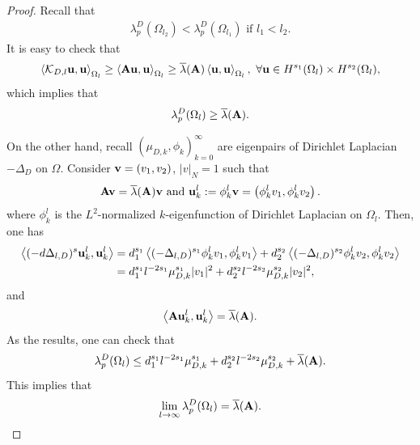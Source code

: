 \documentclass[10pt,a4paper]{amsart}
\def\O{\Omega}
\begin{document}
\begin{proof}
Recall that  
\begin{align*}
\lambda_p^D(\O_{l_2})<\lambda_p^D(\O_{l_1}) \text{ if }l_1<l_2.
\end{align*}
It is easy to check that
\begin{align*}
\left<\mathcal{K}_{D,l}{\bf u},{\bf u}\right>_{\O_l}\geq \left<{\bf Au},{\bf u}\right>_{\O_l} \geq \overline{\lambda}({\bf A}) \left<{\bf u},{\bf u}\right>_{\O_l},~\forall {\bf u}\in H^{s_1}(\O_l)\times H^{s_2}(\O_l),
\end{align*}
which implies that
\begin{align*}
\lambda^D_p(\O_l)\geq \overline{\lambda}({\bf A}).
\end{align*}

On the other hand, recall $(\mu_{D,k},\phi_k)^\infty_{k=0}$ are eigenpairs of Dirichlet Laplacian $-\Delta_D$ on $\O$. Consider ${\bf v}=(v_1,v_2)$, $|v|_N=1$ such that 
\begin{align*}
\text{${\bf Av}=\overline{\lambda}({\bf A}){\bf v}$ and }{\bf u}_k^l:=\phi_k^l {\bf v}=\left(\phi_k^l v_1,\phi_k^l v_2\right).
\end{align*}
where $\phi_k^l$ is the $L^2$-normalized $k$-eigenfunction of Dirichlet Laplacian on $\O_{l}$. Then, one has
\begin{align*}
\left<(-\textbf{d}\Delta_{l,D})^{\textbf{s}}{\bf u}_k^l,{\bf u}_k^l \right>
&=d^{s_1}_1\left<(-\Delta_{l,D})^{s_1}\phi_k^l v_1,\phi_k^l v_1\right>+d^{s_2}_2\left<(-\Delta_{l,D})^{s_2}\phi_k^l v_2,\phi_k^l v_2\right>\\
&=d^{s_1}_1l^{-2s_1}\mu_{D,k}^{s_1}|v_1|^2+d^{s_2}_2l^{-2s_2}\mu_{D,k}^{s_2}|v_2|^2,
\end{align*}
and
\begin{align*}
\left<{\bf A}{\bf u}_k^l,{\bf u}_k^l\right>=\overline{\lambda}({\bf A}).
\end{align*}
As the results, one can check that
\begin{align*}
\lambda^D_p(\O_l)\leq d^{s_1}_1l^{-2s_1}\mu_{D,k}^{s_1}+d^{s_2}_2l^{-2s_2}\mu_{D,k}^{s_2}+\overline{\lambda}({\bf A}).
\end{align*}
This implies that
\begin{align*}
\lim_{l \rightarrow \infty}\lambda^D_p(\O_l)=\overline{\lambda}({\bf A}).
\end{align*}


\end{proof}
\end{document}
